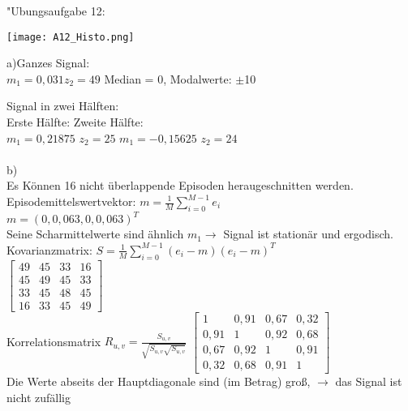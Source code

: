 \documentclass[fleqn,a4paper,12pt]{article}
\begin{document}
	"Ubungsaufgabe 12: \newline
	
	\texttt{[image: A12\_Histo.png]}
	
	a)Ganzes Signal:\\
	$m_1 = 0,031		z_2 = 49$ \hspace{1cm}
	Median = 0,	Modalwerte: $\pm $10
	
	Signal in zwei H\"alften:\\
	Erste H\"alfte:	\hspace{5cm}										Zweite H\"alfte:\\
	$m_1 = 0,21875$  $z_2 = 25$	\hspace{4cm}								$m_1 = -0,15625$  $z_2 = 24$\\
	\\
	b)\\
	Es K\"onnen 16 nicht \"uberlappende Episoden heraugeschnitten werden.
	Episodemittelswertvektor: $m = \frac{1}{M}\sum_{i=0}^{M-1}e_i$\\
	$m = (0, 0,063, 0, 0,063)^T$\\
	Seine Scharmittelwerte sind \"ahnlich $m_1 \rightarrow$ Signal ist  station\"ar und ergodisch.
	\newpage
	Kovarianzmatrix: $S = \frac{1}{M}\sum_{i=0}^{M-1}(e_i-m)(e_i-m)^T$\\
	$
	\begin{bmatrix}
	49   & 45 & 33	 &  16 \\
	45 & 49 	& 45	 &  33 \\
	33  & 45	& 48 	 & 45 \\
	16 & 33	& 45	 &  49
	\end{bmatrix}
	$\\
	Korrelationsmatrix $R_{u,v} = \frac{S_{u,v}}{\sqrt{S_{u,v} \sqrt{S_{u,v}}}}$
	$
	\begin{bmatrix}
	1   & 0,91 & 0,67	 &  0,32 \\
	0,91 & 1 	& 0,92	 &  0,68 \\
	0,67 & 0,92	& 1 	 & 0,91 \\
	0,32 & 0,68	& 0,91	 &  1
	\end{bmatrix}
	$\\Die Werte abseits der Hauptdiagonale sind (im Betrag) gro{\ss}, $\rightarrow$ das Signal ist nicht  zuf\"allig\\
	
\end{document}
